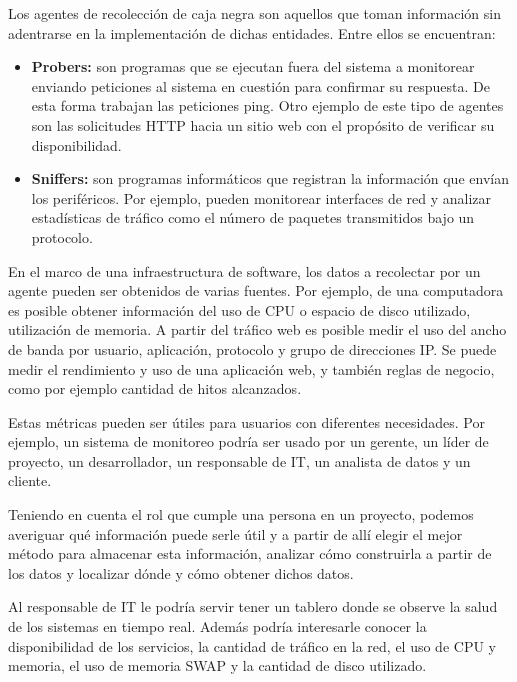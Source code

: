 Los agentes de recolección de caja negra son aquellos que toman información sin
adentrarse en la implementación de dichas entidades. Entre ellos se encuentran:

\begin{itemize}
  \item \textbf{Probers:} son programas que se ejecutan fuera del sistema a
    monitorear enviando peticiones al sistema en cuestión para confirmar su
    respuesta. De esta forma trabajan las peticiones ping. Otro ejemplo de este
    tipo de agentes son las solicitudes HTTP hacia un sitio web con el
    propósito de verificar su disponibilidad.

  \item \textbf{Sniffers:} son programas informáticos que registran la
    información que envían los periféricos. Por ejemplo, pueden monitorear
    interfaces de red y analizar estadísticas de tráfico como el número de
    paquetes transmitidos bajo un protocolo.
    \cite[p.~15-16]{monitoreo:efective_monitoring_and_alerting}
\end{itemize}

En el marco de una infraestructura de software, los datos a recolectar por un
agente pueden ser obtenidos de varias fuentes. Por ejemplo, de una computadora
es posible obtener información del uso de CPU o espacio de disco utilizado,
utilización de memoria. A partir del tráfico web es posible medir el uso del
ancho de banda por usuario, aplicación, protocolo y grupo de direcciones IP. Se
puede medir el rendimiento y uso de una aplicación web, y también reglas de
negocio, como por ejemplo cantidad de hitos alcanzados.

Estas métricas pueden ser útiles para usuarios con diferentes necesidades. Por
ejemplo, un sistema de monitoreo podría ser usado por un gerente, un líder de
proyecto, un desarrollador, un responsable de IT, un analista de datos y un
cliente.

Teniendo en cuenta el rol que cumple una persona en un proyecto, podemos
averiguar qué información puede serle útil y a partir de allí elegir el mejor
método para almacenar esta información, analizar cómo construirla a partir de
los datos y localizar dónde y cómo obtener dichos datos.

Al responsable de IT le podría servir tener un tablero donde se observe la
salud de los sistemas en tiempo real. Además podría interesarle conocer la
disponibilidad de los servicios, la cantidad de tráfico en la red, el uso de
CPU y memoria, el uso de memoria SWAP y la cantidad de disco utilizado.

